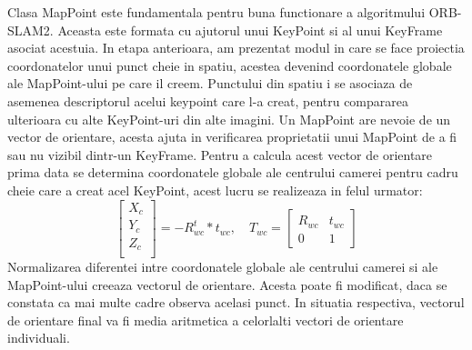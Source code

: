 \documentclass[12pt,a4paper]{report}
\begin{document}
Clasa MapPoint este fundamentala pentru buna functionare a algoritmului ORB-SLAM2. Aceasta este 
formata cu ajutorul unui KeyPoint si al unui KeyFrame asociat acestuia. In etapa anterioara, 
am prezentat modul in care se face proiectia coordonatelor unui punct cheie in spatiu, acestea 
devenind coordonatele globale ale MapPoint-ului pe care il creem. Punctului din spatiu 
i se asociaza de asemenea descriptorul acelui keypoint care l-a creat, pentru compararea ulterioara 
cu alte KeyPoint-uri din alte imagini. Un MapPoint are nevoie de un vector de orientare, acesta 
ajuta in verificarea proprietatii unui MapPoint de a fi sau nu vizibil dintr-un KeyFrame. Pentru a 
calcula acest vector de orientare prima data se determina coordonatele globale ale centrului camerei
pentru cadru cheie care a creat acel KeyPoint, acest lucru se realizeaza in felul urmator:
\begin{equation}
    \begin{bmatrix}
        X_{c} \\
        Y_{c} \\
        Z_{c} \\
        \end{bmatrix} = -R_{wc}^t * t_{wc}, \quad{}  
        T_{wc} =     
     \begin{bmatrix}
            R_{wc} & t_{wc} \\
            0 & 1
        \end{bmatrix}
\end{equation} 
Normalizarea diferentei intre coordonatele globale ale centrului camerei si ale MapPoint-ului creeaza
vectorul de orientare. Acesta poate fi modificat, daca se constata ca mai multe cadre observa acelasi
punct. In situatia respectiva, vectorul de orientare final va fi media aritmetica a celorlalti vectori 
de orientare individuali.
\end{document}
